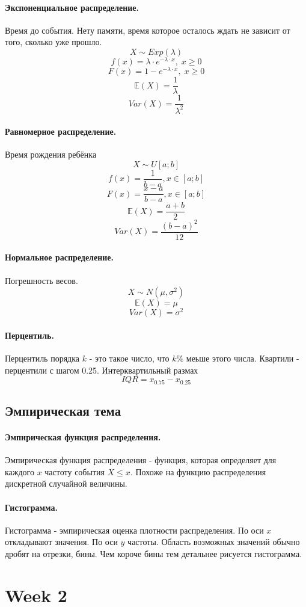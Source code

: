 \documentclass{article}
\newcommand{\E}{\mathbb{E}}
\begin{document}
\paragraph{Экспоненциальное распределение.}
Время до события. Нету памяти, время которое осталось ждать не зависит от того, сколько уже прошло.
\[
X \sim Exp(\lambda)
\]
\[
f(x)=\lambda \cdot e^{-\lambda \cdot x}, \; x \geq 0
\]
\[
F(x)=1-e^{-\lambda \cdot x}, \; x \geq 0
\]
\[
\E(X) = \frac{1}{\lambda}
\]
\[
Var(X)=\frac{1}{\lambda^2}
\]
\paragraph{Равномерное распределение.}
Время рождения ребёнка
\[
X \sim U[a;b]
\]
\[
f(x)=\frac{1}{b-a}, x \in [a;b]
\]
\[
F(x)=\frac{x-a}{b-a}, x \in [a;b]
\]
\[
\E(X)= \frac{a+b}{2}
\]
\[
Var(X)=\frac{(b-a)^2}{12}
\]
\paragraph{Нормальное распределение.}
Погрешность весов.
\[
X \sim N(\mu,\sigma^2)
\]
\[
\E(X) = \mu
\]
\[
Var(X)=\sigma^2
\]
\paragraph{Перцентиль.}
Перцентиль порядка $k$ - это такое число, что $k\%$ меьше этого числа. Квартили - перцентили с шагом 0.25. Интерквартильный размах
\[
IQR = x_{0.75}-x_{0.25} 
\]
\subsection{Эмпирическая тема}
\paragraph{Эмпирическая функция распределения.}
Эмпирическая функция распределения - функция, которая определяет для каждого $x$ частоту события $X \leq x$. Похоже на функцию распределения дискретной случайной величины.
\paragraph{Гистограмма.}
Гистограмма - эмпирическая оценка плотности распределения. По оси $x$ откладывают значения. По оси $y$ частоты. Область возможных значений обычно дробят на отрезки, бины. Чем короче бины тем детальнее рисуется гистограмма.
\section{Week 2}
\end{document}
